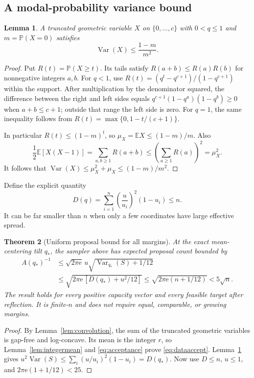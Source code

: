 \documentclass[11pt,a4paper]{article}
\newtheorem{theorem}{Theorem}[section]
\newtheorem{lemma}[theorem]{Lemma}
\theoremstyle{definition}
\newcommand{\E}{\mathbb E}
\newcommand{\Prob}{\mathbb P}
\newcommand{\Var}{\operatorname{Var}}
\newcommand{\ee}{\mathrm e}
\begin{document}
\subsection{A modal-probability variance bound}

\begin{lemma}\label{lem:modalvariance}
A truncated geometric variable $X$ on $\{0,\ldots,c\}$ with $0<q\le1$ and $m=\Prob(X=0)$ satisfies
\begin{equation}\label{eq:modalvar}
 \Var(X)\le\frac{1-m}{m^2}.
\end{equation}
\end{lemma}
\begin{proof}
Put $R(t)=\Prob(X\ge t)$. Its tails satisfy
$R(a+b)\le R(a)R(b)$ for nonnegative integers $a,b$.
For $q<1$, use $R(t)=(q^t-q^{c+1})/(1-q^{c+1})$ within the support. After multiplication by the denominator squared, the difference between the right and left sides equals
$q^{c+1}(1-q^a)(1-q^b)\ge0$ when $a+b\le c+1$; outside that range the left side is zero. For $q=1$, the same inequality follows from $R(t)=\max\{0,1-t/(c+1)\}$.

In particular $R(t)\le(1-m)^t$, so $\mu_X=\E X\le(1-m)/m$. Also
\[
 \frac12\E[X(X-1)]
 =\sum_{a,b\ge1}R(a+b)
 \le\left(\sum_{a\ge1}R(a)\right)^2=\mu_X^2.
\]
It follows that $\Var(X)\le\mu_X^2+\mu_X\le(1-m)/m^2$.
\end{proof}

Define the explicit quantity
\begin{equation}\label{eq:effective}
 D(q)=\sum_{i=1}^n\left(\frac{u}{u_i}\right)^2(1-u_i)\le n.
\end{equation}
It can be far smaller than $n$ when only a few coordinates have large effective spread.

\begin{theorem}[Uniform proposal bound for all margins]\label{thm:sampler}
At the exact mean-centering tilt $q_*$, the sampler above has expected proposal count bounded by
\begin{align}
 A(q_*)^{-1}
 &\le\sqrt{2\pi\ee}\,u\sqrt{\Var_{q_*}(S)+1/12}
 \label{eq:dataaccept}\\
 &\le\sqrt{2\pi\ee\,[D(q_*)+u^2/12]}
 \le\sqrt{2\pi\ee(n+1/12)}<5\sqrt n.
 \label{eq:uniformaccept}
\end{align}
The result holds for every positive capacity vector and every feasible target after reflection. It is finite-$n$ and does not require equal, comparable, or growing margins.
\end{theorem}
\begin{proof}
By Lemma~\ref{lem:convolution}, the sum of the truncated geometric variables is gap-free and log-concave. Its mean is the integer $r$, so Lemma~\ref{lem:integermean} and \eqref{eq:acceptance} prove \eqref{eq:dataaccept}. Lemma~\ref{lem:modalvariance} gives
$u^2\Var(S)\le\sum_i(u/u_i)^2(1-u_i)=D(q_*)$.
Now use $D\le n$, $u\le1$, and $2\pi\ee(1+1/12)<25$.
\end{proof}
\end{document}
